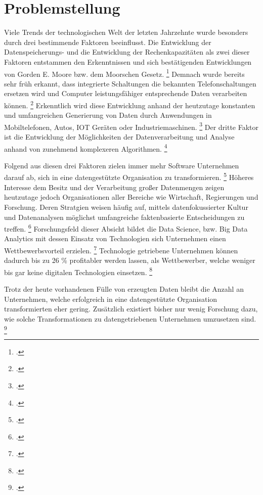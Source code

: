 \chapter[Problemstellung]{Problemstellung}

Viele Trends der technologischen Welt der letzten Jahrzehnte wurde besonders durch drei bestimmende Faktoren beeinflusst.
Die Entwicklung der Datenspeicherungs- und die Entwicklung der Rechenkapazitäten als zwei dieser Faktoren entstammen den Erkenntnissen und sich bestätigenden Entwicklungen von Gorden E. Moore bzw. dem Moorschen Gesetz. \footcite[prenote][postnote]{(By 1975)}
Demnach wurde bereits sehr früh erkannt, dass integrierte Schaltungen die bekannten Telefonschaltungen ersetzen wird und Computer leistungsfähiger entsprechende Daten verarbeiten können. \footcite[prenote][postnote]{(Integrated circuits)}
Erkenntlich wird diese Entwicklung anhand der heutzutage konstanten und umfangreichen Generierung von Daten durch Anwendungen in Mobiltelefonen, Autos, IOT Geräten oder Industriemaschinen. \footcite[prenote][postnote]{constant generation}
Der dritte Faktor ist die Entwicklung der Möglichkeiten der Datenverarbeitung und Analyse anhand von zunehmend komplexeren Algorithmen. \footcite[prenote][postnote]{(significant evolution)}

Folgend aus diesen drei Faktoren zielen immer mehr Software Unternehmen darauf ab, sich in eine datengestützte Organisation zu transformieren. \footcite[prenote][postnote]{(Software development companies)}
Höheres Interesse dem Besitz und der Verarbeitung großer Datenmengen zeigen heutzutage jedoch Organisationen aller Bereiche wie Wirtschaft, Regierungen und Forschung.
Deren Stratgien weisen häufig auf, mittels datenfokussierter Kultur und Datenanalysen möglichst umfangreiche faktenbasierte Entscheidungen zu treffen. \footcite[prenote][postnote]{(general trend)}
Forschungsfeld dieser Absicht bildet die Data Science, bzw. Big Data Analytics mit dessen Einsatz von Technologien sich Unternehmen einen Wettbewerbsvorteil erzielen. \footcite[prenote][postnote]{(organisations are turning)}
Technologie getriebene Unternehmen können dadurch bis zu 26 \% profitabler werden lassen, als Wettbewerber, welche weniger bis gar keine digitalen Technologien einsetzen. \footcite[prenote][postnote]{(DDOs are more profitable)}

Trotz der heute vorhandenen Fülle von erzeugten Daten bleibt die Anzahl an Unternehmen, welche erfolgreich in eine datengestützte Organisation transformierten eher gering.
Zusätzlich existiert bisher nur wenig Forschung dazu, wie solche Transformationen zu datengetriebenen Unternehmen umzusetzen sind. \footcite[prenote][postnote]{(despite having data)}

